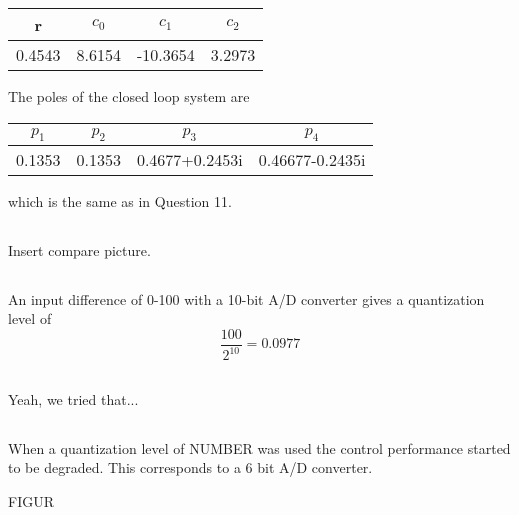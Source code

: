 \documentclass[12pt,a4paper]{article}
\begin{document}
\begin{center}
	\begin{tabular}{| c | c | c | c |}
	\hline
	r & $c_0$ & $c_1$ & $c_2$ \\
	\hline
	0.4543 & 8.6154 & -10.3654 & 3.2973 \\
	\hline
	\end{tabular}
\end{center}

The poles of the closed loop system are
\begin{center}
	\begin{tabular}{| c | c | c | c |}
	\hline
	$p_1$ & $p_2$ & $p_3$ & $p_4$ \\
	\hline
	0.1353 & 0.1353 & 0.4677+0.2453i & 0.46677-0.2435i\\
	\hline
	\end{tabular}
\end{center}
which is the same as in Question 11.

\subsection{}%
Insert compare picture.

\subsection{}%
An input difference of 0-100 with a 10-bit A/D converter gives a quantization level of
\begin{equation}
	\frac{100}{2^{10}} = 0.0977
\end{equation}

\subsection{}%
Yeah, we tried that...

\subsection{}%
When a quantization level of NUMBER was used the control performance started to be degraded. This corresponds to a 6 bit A/D converter.

FIGUR
\end{document}
